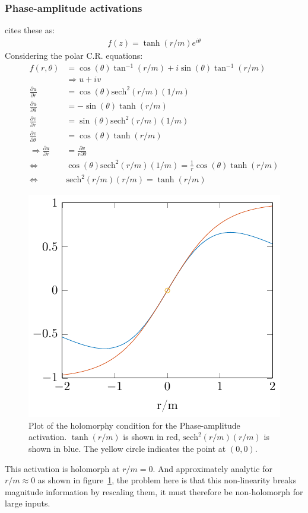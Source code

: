 \documentclass{article}
\begin{document}
\subsubsection{Phase-amplitude activations}
\cite{Scardapane} cites these as:
\begin{align}
f(z) = \tanh(r/m)e^{i\theta}
\end{align}
Considering the polar C.R. equations:
\begin{align}
f(r,\theta) &= \cos(\theta)\tan^{-1}(r/m) + i\sin(\theta)\tan^{-1}(r/m) \\
            &\Rightarrow u + iv \nonumber \\
\frac{\partial u}{\partial r} &= \cos(\theta)\text{sech}^2(r/m)(1/m) \\
\frac{\partial u}{\partial \theta} &= -\sin(\theta)\tanh(r/m) \\
\frac{\partial v}{\partial r} &= \sin(\theta)\text{sech}^2(r/m)(1/m) \\
\frac{\partial v}{\partial \theta} &= \cos(\theta)\tanh(r/m) \\
\Rightarrow  \frac{\partial u}{\partial r} &=\frac{\partial v}{r\partial \theta} \nonumber \\
\Leftrightarrow \qquad & \cos(\theta)\text{sech}^2(r/m)(1/m) = \frac{1}{r}\cos(\theta)\tanh(r/m) \\
\Leftrightarrow \qquad & \text{sech}^2(r/m)(r/m) = \tanh(r/m)
\label{eq:holo-pa}
\end{align}
\begin{figure}
\centering
\includegraphics{./img/phase_amplitude_cond.pdf}
\caption{Plot of the holomorphy condition for the Phase-amplitude activation. $\tanh(r/m)$ is shown in red, $\text{sech}^2(r/m)(r/m)$ is shown in blue. The yellow circle indicates the point at $(0,0)$.}
\label{fig:phase_amp}
\end{figure}
This activation is holomorph at $r/m = 0$. And approximately analytic for $r/m \approx 0$ as shown in figure~\ref{fig:phase_amp}, the problem here is that this non-linearity breaks magnitude information by rescaling them, it must therefore be non-holomorph for large inputs.
\end{document}
